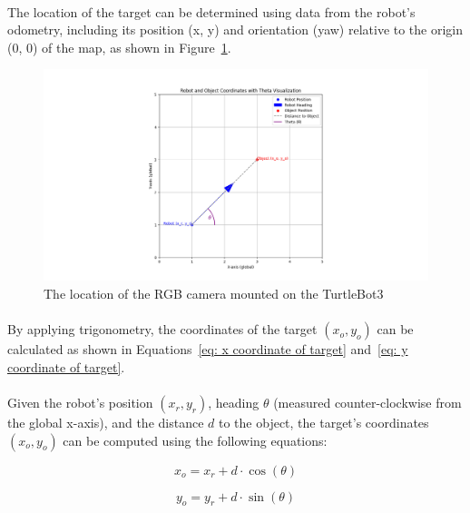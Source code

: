 \paragraph*{}
The location of the target can be determined using data from the robot’s odometry, including its position (x, y) and orientation (yaw) relative to the origin (0, 0) of the map, as shown in Figure~\ref{fig:coordinate visualization}.

\begin{figure}[H]
    \centering
    \includegraphics[width=1.1\linewidth]{assets/images/object_detection/fig3.png}
    \caption{The location of the RGB camera mounted on the TurtleBot3}
    \label{fig:coordinate visualization} 
\end{figure}

\paragraph*{}
By applying trigonometry, the coordinates of the target \((x_o, y_o)\) can be calculated as shown in Equations~\ref{eq: x coordinate of target} and~\ref{eq: y coordinate of target}.

\paragraph*{}
Given the robot’s position \((x_r, y_r)\), heading \(\theta\) (measured counter-clockwise from the global x-axis), and the distance \(d\) to the object, the target’s coordinates \((x_o, y_o)\) can be computed using the following equations:

\begin{equation}
x_o = x_r + d \cdot \cos(\theta)
\label{eq: x coordinate of target}
\end{equation}

\begin{equation}
y_o = y_r + d \cdot \sin(\theta)
\label{eq: y coordinate of target}
\end{equation}

